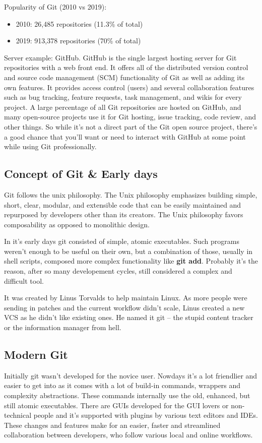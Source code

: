 \documentclass[12pt,a4]{article}
\newcommand{\ilcode}[1]{\textcolor[RGB]{160, 110, 220}{#1}}
\begin{document}
Popularity of Git (2010 vs 2019):
\vspace*{-5pt}
\begin{itemize}
\item 2010: 26,485 repositories (11.3\% of total)
\item 2019: 913,378 repositories (70\% of total)
\end{itemize}

{\sf Server example:} GitHub. GitHub is the single largest hosting server for
Git repositories with a web front end. It offers all of the distributed version
control and source code management (SCM) functionality of Git as well as adding
its own features. It provides access control (users) and several collaboration
features such as bug tracking, feature requests, task management, and wikis for
every project. A large percentage of all Git repositories are hosted on GitHub,
and many open-source projects use it for Git hosting, issue tracking, code
review, and other things. So while it’s not a direct part of the Git open source
project, there’s a good chance that you’ll want or need to interact with GitHub
at some point while using Git professionally.

\subsection{Concept of Git \& Early days}
Git follows the unix philosophy. The Unix philosophy emphasizes building simple,
short, clear, modular, and extensible code that can be easily maintained and
repurposed by developers other than its creators. The Unix philosophy favors
composability as opposed to monolithic design.

In it's early days git consisted of simple, atomic executables. Such programs
weren't enough to be useful on their own, but a combination of those, usually in
shell scripts, composed more complex functionality like \ilcode{\bf git add}.
Probably it's the reason, after so many developement cycles, still considered a
complex and difficult tool.

It was created by Linus Torvalds to help maintain Linux. As more people were
sending in patches and the current workflow didn't scale, Linus created a new
VCS as he didn't like existing ones. He named it git -- the stupid content
tracker or the information manager from hell.

\subsection{Modern Git}
Initially git wasn't developed for the novice user. Nowdays it's a lot
friendlier and easier to get into as it comes with a lot of build-in commands,
wrappers and complexity abstractions. These commands internally use the old,
enhanced, but still atomic executables. There are GUIs developed for the GUI
lovers or non-technical people and it's supported with plugins by various text
editors and IDEs. These changes and features make for an easier, faster and
streamlined collaboration between developers, who follow various local and
online workflows.
\end{document}

